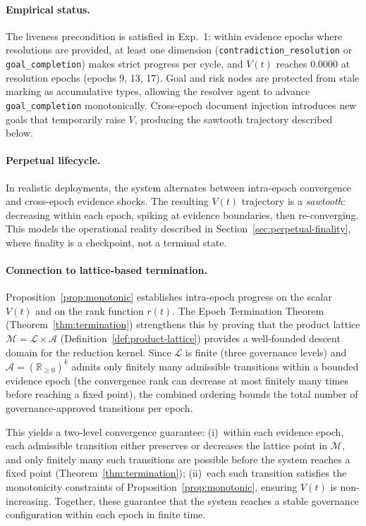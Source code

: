 \documentclass[11pt]{article}
\begin{document}
\paragraph{Empirical status.} The liveness precondition is satisfied in Exp.~1: within evidence epochs where resolutions are provided, at least one dimension (\texttt{contradiction\_resolution} or \texttt{goal\_completion}) makes strict progress per cycle, and $V(t)$ reaches 0.0000 at resolution epochs (epochs 9, 13, 17). Goal and risk nodes are protected from stale marking as accumulative types, allowing the resolver agent to advance \texttt{goal\_completion} monotonically. Cross-epoch document injection introduces new goals that temporarily raise $V$, producing the sawtooth trajectory described below.

\paragraph{Perpetual lifecycle.} In realistic deployments, the system alternates between intra-epoch convergence and cross-epoch evidence shocks. The resulting $V(t)$ trajectory is a \emph{sawtooth}: decreasing within each epoch, spiking at evidence boundaries, then re-converging. This models the operational reality described in Section~\ref{sec:perpetual-finality}, where finality is a checkpoint, not a terminal state.

\paragraph{Connection to lattice-based termination.} Proposition~\ref{prop:monotonic} establishes intra-epoch progress on the scalar $V(t)$ and on the rank function $r(t)$. The Epoch Termination Theorem (Theorem~\ref{thm:termination}) strengthens this by proving that the product lattice $\mathcal{M} = \mathcal{L} \times \mathcal{A}$ (Definition~\ref{def:product-lattice}) provides a well-founded descent domain for the reduction kernel. Since $\mathcal{L}$ is finite (three governance levels) and $\mathcal{A} = (\mathbb{R}_{\geq 0})^k$ admits only finitely many admissible transitions within a bounded evidence epoch (the convergence rank can decrease at most finitely many times before reaching a fixed point), the combined ordering bounds the total number of governance-approved transitions per epoch.

This yields a two-level convergence guarantee: (i)~within each evidence epoch, each admissible transition either preserves or decreases the lattice point in $\mathcal{M}$, and only finitely many such transitions are possible before the system reaches a fixed point (Theorem~\ref{thm:termination}); (ii)~each such transition satisfies the monotonicity constraints of Proposition~\ref{prop:monotonic}, ensuring $V(t)$ is non-increasing. Together, these guarantee that the system reaches a stable governance configuration within each epoch in finite time.
\end{document}
